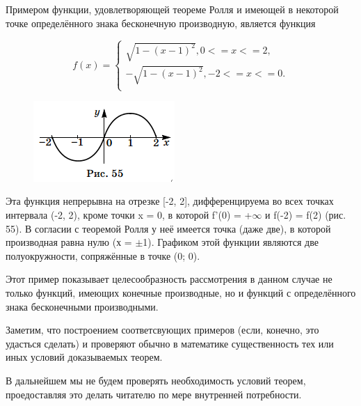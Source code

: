 \documentclass[book, 12pt]{article}
\begin{document}
\leftskip=8cm
  Примером функции, удовлетворяющей теореме Ролля и имеющей в некоторой точке определённого знака бесконечную производную, является функция

\leftskip=10cm
\begin{equation}
	f(x) = \begin{cases}
		 \sqrt{1 - (x - 1) ^ 2},  0 <= x <= 2,\\
		-\sqrt{1 - (x - 1) ^ 2},  -2 <= x <= 0.\\
	\end{cases}
\end{equation}

\begin{figure} 
\vspace{-30ex}
\includegraphics[width=\linewidth]{Graphic.png}
\label{fig:somelabel}
\end{figure}

\leftskip=0cm
\setlength{\parindent}{-4cm}
Эта функция непрерывна на отрезке [-2, 2], дифференцируема во всех точках
интервала (-2, 2), кроме точки x = 0, в которой f'(0) = +$\infty$ и f(-2) = f(2) (рис. 55).
В согласии с теоремой Ролля у неё имеется точка (даже две), в которой
производная равна нулю (х = $\pm$1). Графиком этой функции являются две полуокружности,
сопряжённые в точке (0; 0).

\setlength{\parindent}{1cm}
Этот пример показывает целесообразность рассмотрения в данном случае не только функций, 
имеющих конечные производные, но и функций с определённого знака бесконечными производными.

Заметим, что построением соответсвующих примеров (если, конечно, это удасться сделать) и проверяют обычно
в математике существенность тех или иных условий доказываемых теорем.

В дальнейшем мы не будем проверять необходимость условий теорем, проедоставляя это делать читателю по мере
внутренней потребности.
\end{document}

